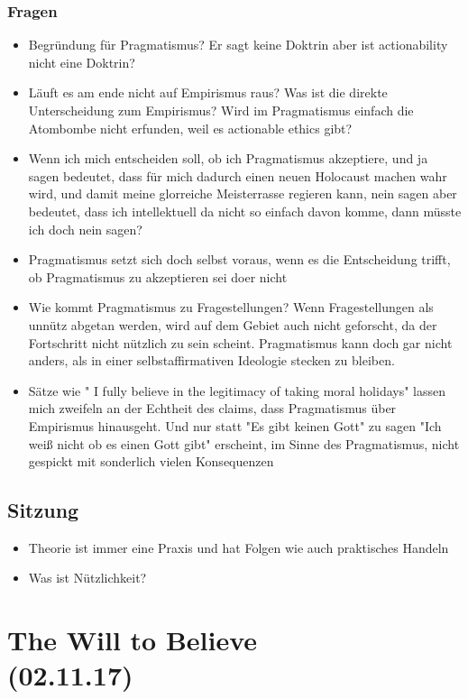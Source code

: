 \documentclass[emulatestandardclasses]{scrartcl}
\begin{document}
\subsubsection{Fragen}

\begin{itemize}
  \item Begründung für Pragmatismus? Er sagt keine Doktrin aber ist actionability nicht eine Doktrin?
  \item Läuft es am ende nicht auf Empirismus raus? Was ist die direkte Unterscheidung zum Empirismus? Wird im Pragmatismus einfach die Atombombe nicht erfunden, weil es actionable ethics gibt?
  \item Wenn ich mich entscheiden soll, ob ich Pragmatismus akzeptiere, und ja sagen bedeutet, dass für mich dadurch einen neuen Holocaust machen wahr wird, und damit meine glorreiche Meisterrasse regieren kann, nein sagen aber bedeutet, dass ich intellektuell da nicht so einfach davon komme, dann müsste ich doch nein sagen?
  \item Pragmatismus setzt sich doch selbst voraus, wenn es die Entscheidung trifft, ob Pragmatismus zu akzeptieren sei doer nicht
  \item Wie kommt Pragmatismus zu Fragestellungen? Wenn Fragestellungen als unnütz abgetan werden, wird auf dem Gebiet auch nicht geforscht, da der Fortschritt nicht nützlich zu sein scheint. Pragmatismus kann doch gar nicht anders, als in einer selbstaffirmativen Ideologie stecken zu bleiben.
  \item Sätze wie " I fully believe in the legitimacy of taking moral holidays" lassen mich zweifeln an der Echtheit des claims, dass Pragmatismus über Empirismus hinausgeht. Und nur statt "Es gibt keinen Gott" zu sagen "Ich weiß nicht ob es einen Gott gibt" erscheint, im Sinne des Pragmatismus, nicht gespickt mit sonderlich vielen Konsequenzen
\end{itemize}

\subsection{Sitzung}

\begin{itemize}
  \item Theorie ist immer eine Praxis und hat Folgen wie auch praktisches Handeln
  \item Was ist Nützlichkeit? 
\end{itemize}

\section{The Will to Believe\\(02.11.17)}
\end{document}

